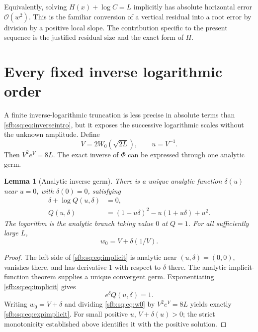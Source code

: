 \documentclass[11pt]{article}
\newtheorem{lemma}[theorem]{Lemma}
\theoremstyle{remark}\newtheorem{remark}[theorem]{Remark}
\newcommand{\OO}{\mathcal O}
\begin{document}
Equivalently, solving $H(x)+\log C=L$ implicitly has absolute horizontal error $\OO(w^2)$. This is the familiar conversion of a vertical residual into a root error by division by a positive local slope. The contribution specific to the present sequence is the justified residual size and the exact form of $H$.

\section{Every fixed inverse logarithmic order}\label{sfb:sq:sec:germ}
A finite inverse-logarithmic truncation is less precise in absolute terms than \eqref{sfb:sq:eq:inverseintro}, but it exposes the successive logarithmic scales without the unknown amplitude. Define
\begin{equation}\label{sfb:sq:eq:Vgerm}
 V=2W_0(\sqrt{2L}),\qquad u=V^{-1}.
\end{equation}
Then $V^2e^V=8L$. The exact inverse of $\Phi$ can be expressed through one analytic germ.

\begin{lemma}[Analytic inverse germ]\label{sfb:sq:lem:germ}
There is a unique analytic function $\delta(u)$ near $u=0$, with $\delta(0)=0$, satisfying
\begin{align}
 \delta+\log Q(u,\delta)&=0,\label{sfb:sq:eq:implicit}\\
 Q(u,\delta)&=(1+u\delta)^2-u(1+u\delta)+u^2.\label{sfb:sq:eq:Q}
\end{align}
The logarithm is the analytic branch taking value $0$ at $Q=1$. For all sufficiently large $L$,
\begin{equation}\label{sfb:sq:eq:w0germ}
 w_0=V+\delta(1/V).
\end{equation}
\end{lemma}
\begin{proof}
The left side of \eqref{sfb:sq:eq:implicit} is analytic near $(u,\delta)=(0,0)$, vanishes there, and has derivative $1$ with respect to $\delta$ there. The analytic implicit-function theorem supplies a unique convergent germ. Exponentiating \eqref{sfb:sq:eq:implicit} gives
\begin{equation}\label{sfb:sq:eq:expimplicit}
 e^\delta Q(u,\delta)=1.
\end{equation}
Writing $w_0=V+\delta$ and dividing \eqref{sfb:sq:eq:w0} by $V^2e^V=8L$ yields exactly \eqref{sfb:sq:eq:expimplicit}. For small positive $u$, $V+\delta(u)>0$; the strict monotonicity established above identifies it with the positive solution.
\end{proof}
\end{document}
